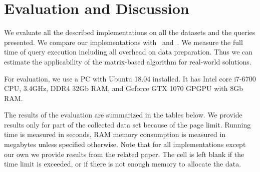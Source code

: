 \section{Evaluation and Discussion}

We evaluate all the described implementations on all the datasets and the queries presented.
We compare our implementations with~\cite{Mishin:2019:ECP:3327964.3328503} and~\cite{Kuijpers:2019:ESC:3335783.3335791}.
We measure the full time of query execution including all overhead on data preparation.
Thus we can estimate the applicability of the matrix-based algorithm for real-world solutions.

For evaluation, we use a PC with Ubuntu 18.04 installed.
It has Intel core i7-6700 CPU, 3.4GHz, DDR4 32Gb RAM, and Geforce GTX 1070 GPGPU with 8Gb RAM.

The results of the evaluation are summarized in the tables below.
We provide results only for part of the collected data set because of the page limit.
Running time is measured in seconds, RAM memory consumption is measured in megabytes unless specified otherwise.
Note that for all implementations except our own we provide results from the related paper.
The cell is left blank if the time limit is exceeded, or if there is not enough memory to allocate the data.


